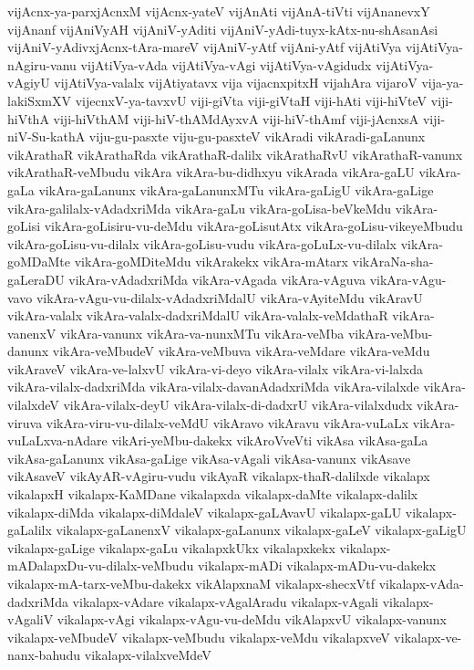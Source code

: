 {vijAcnx-ya-parxjAcnxM
vijAcnx-yateV
vijAnAti
vijAnA-tiVti
vijAnanevxY
vijAnanf
vijAniVyAH
vijAniV-yAditi
vijAniV-yAdi-tuyx-kAtx-nu-shAsanAsi
vijAniV-yAdivxjAcnx-tAra-mareV
vijAniV-yAtf
vijAni-yAtf
vijAtiVya
vijAtiVya-nAgiru-vanu
vijAtiVya-vAda
vijAtiVya-vAgi
vijAtiVya-vAgidudx
vijAtiVya-vAgiyU
vijAtiVya-valalx
vijAtiyatavx
vija
vijacnxpitxH
vijahAra
vijaroV
vija-ya-lakiSxmXV
vijecnxV-ya-tavxvU
viji-giVta
viji-giVtaH
viji-hAti
viji-hiVteV
viji-hiVthA
viji-hiVthAM
viji-hiV-thAMdAyxvA
viji-hiV-thAmf
viji-jAcnxsA
viji-niV-Su-kathA
viju-gu-pasxte
viju-gu-pasxteV
vikAradi
vikAradi-gaLanunx
vikArathaR
vikArathaRda
vikArathaR-dalilx
vikArathaRvU
vikArathaR-vanunx
vikArathaR-veMbudu
vikAra
vikAra-bu-didhxyu
vikArada
vikAra-gaLU
vikAra-gaLa
vikAra-gaLanunx
vikAra-gaLanunxMTu
vikAra-gaLigU
vikAra-gaLige
vikAra-galilalx-vAdadxriMda
vikAra-gaLu
vikAra-goLisa-beVkeMdu
vikAra-goLisi
vikAra-goLisiru-vu-deMdu
vikAra-goLisutAtx
vikAra-goLisu-vikeyeMbudu
vikAra-goLisu-vu-dilalx
vikAra-goLisu-vudu
vikAra-goLuLx-vu-dilalx
vikAra-goMDaMte
vikAra-goMDiteMdu
vikArakekx
vikAra-mAtarx
vikAraNa-sha-gaLeraDU
vikAra-vAdadxriMda
vikAra-vAgada
vikAra-vAguva
vikAra-vAgu-vavo
vikAra-vAgu-vu-dilalx-vAdadxriMdalU
vikAra-vAyiteMdu
vikAravU
vikAra-valalx
vikAra-valalx-dadxriMdalU
vikAra-valalx-veMdathaR
vikAra-vanenxV
vikAra-vanunx
vikAra-va-nunxMTu
vikAra-veMba
vikAra-veMbu-danunx
vikAra-veMbudeV
vikAra-veMbuva
vikAra-veMdare
vikAra-veMdu
vikAraveV
vikAra-ve-lalxvU
vikAra-vi-deyo
vikAra-vilalx
vikAra-vi-lalxda
vikAra-vilalx-dadxriMda
vikAra-vilalx-davanAdadxriMda
vikAra-vilalxde
vikAra-vilalxdeV
vikAra-vilalx-deyU
vikAra-vilalx-di-dadxrU
vikAra-vilalxdudx
vikAra-viruva
vikAra-viru-vu-dilalx-veMdU
vikAravo
vikAravu
vikAra-vuLaLx
vikAra-vuLaLxva-nAdare
vikAri-yeMbu-dakekx
vikAroVveVti
vikAsa
vikAsa-gaLa
vikAsa-gaLanunx
vikAsa-gaLige
vikAsa-vAgali
vikAsa-vanunx
vikAsave
vikAsaveV
vikAyAR-vAgiru-vudu
vikAyaR
vikalapx-thaR-dalilxde
vikalapx
vikalapxH
vikalapx-KaMDane
vikalapxda
vikalapx-daMte
vikalapx-dalilx
vikalapx-diMda
vikalapx-diMdaleV
vikalapx-gaLAvavU
vikalapx-gaLU
vikalapx-gaLalilx
vikalapx-gaLanenxV
vikalapx-gaLanunx
vikalapx-gaLeV
vikalapx-gaLigU
vikalapx-gaLige
vikalapx-gaLu
vikalapxkUkx
vikalapxkekx
vikalapx-mADalapxDu-vu-dilalx-veMbudu
vikalapx-mADi
vikalapx-mADu-vu-dakekx
vikalapx-mA-tarx-veMbu-dakekx
vikAlapxnaM
vikalapx-shecxVtf
vikalapx-vAda-dadxriMda
vikalapx-vAdare
vikalapx-vAgalAradu
vikalapx-vAgali
vikalapx-vAgaliV
vikalapx-vAgi
vikalapx-vAgu-vu-deMdu
vikAlapxvU
vikalapx-vanunx
vikalapx-veMbudeV
vikalapx-veMbudu
vikalapx-veMdu
vikalapxveV
vikalapx-ve-nanx-bahudu
vikalapx-vilalxveMdeV
}
